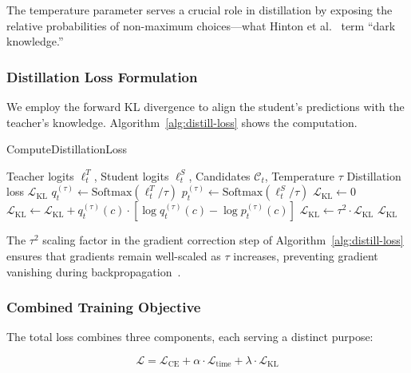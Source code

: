 The temperature parameter serves a crucial role in distillation by exposing the relative probabilities of non-maximum choices---what Hinton et al.~\cite{hintonDistillingKnowledgeNeural2015} term ``dark knowledge.''

\subsubsection{Distillation Loss Formulation}
\label{sec:method-kl}
We employ the forward KL divergence to align the student's predictions with the teacher's knowledge. Algorithm~\ref{alg:distill-loss} shows the computation.

\begin{algorithm}[t]
\caption{ComputeDistillationLoss}
\label{alg:distill-loss}
\begin{algorithmic}
\Require Teacher logits $\ell^T_t$, Student logits $\ell^S_t$, Candidates $\mathcal{C}_t$, Temperature $\tau$
\Ensure Distillation loss $\mathcal{L}_{\text{KL}}$
\State $q^{(\tau)}_t \gets \text{Softmax}(\ell^T_t / \tau)$ 
\State $p^{(\tau)}_t \gets \text{Softmax}(\ell^S_t / \tau)$ 
\State $\mathcal{L}_{\text{KL}} \gets 0$
     
        \State $\mathcal{L}_{\text{KL}} \gets \mathcal{L}_{\text{KL}} + q^{(\tau)}_t(c) \cdot [\log q^{(\tau)}_t(c) - \log p^{(\tau)}_t(c)]$
    \EndIf
\EndFor
\State $\mathcal{L}_{\text{KL}} \gets \tau^2 \cdot \mathcal{L}_{\text{KL}}$ 
\State \Return $\mathcal{L}_{\text{KL}}$
\end{algorithmic}
\end{algorithm}

\begin{remark}
The $\tau^2$ scaling factor in the gradient correction step of Algorithm~\ref{alg:distill-loss} ensures that gradients remain well-scaled as $\tau$ increases, preventing gradient vanishing during backpropagation~\cite{hintonDistillingKnowledgeNeural2015}.
\end{remark}

\subsubsection{Combined Training Objective}
\label{sec:method-combined}
The total loss combines three components, each serving a distinct purpose:

\begin{equation}
\mathcal{L} = \mathcal{L}_{\text{CE}} + \alpha \cdot \mathcal{L}_{\text{time}} + \lambda \cdot \mathcal{L}_{\text{KL}}
\label{eq:total-loss}
\end{equation}

